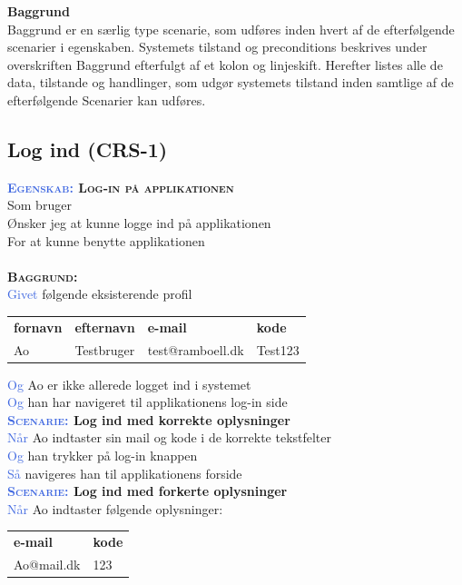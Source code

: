 \large{\textbf{Baggrund}}\\
Baggrund er en særlig type scenarie, som udføres inden hvert af de 
efterfølgende scenarier	i egenskaben. Systemets tilstand og preconditions 
beskrives under overskriften Baggrund efterfulgt af et kolon og 
linjeskift. Herefter listes alle de data, tilstande og handlinger, som udgør 
systemets tilstand inden samtlige af de efterfølgende Scenarier kan	udføres.


\subsection{Log ind (CRS-1)} \label{sec:USLogInd}
\textbf{\textsc{\textcolor{RoyalBlue} {Egenskab:} Log-in på applikationen}} \\
Som bruger\\
Ønsker jeg at kunne logge ind på applikationen\\
For at kunne benytte applikationen\\ \\

\textbf{\textsc{\color{RoyalBlue}Baggrund:}}\\
\textcolor{RoyalBlue}{Givet} følgende eksisterende profil\\
\begin{tabular}{| l | l | l | l |}
	\textbf{fornavn} & \textbf{efternavn} & \textbf{e-mail} & \textbf{kode} \\
	Ao & Testbruger & test@ramboell.dk & Test123\\
\end{tabular}
\newline \newline
\textcolor{RoyalBlue}{Og} Ao er ikke allerede logget ind i systemet\\
\textcolor{RoyalBlue}{Og} han har navigeret til applikationens log-in side\\

\textbf{\textsc{\textcolor{RoyalBlue}{Scenarie:}} Log ind med korrekte oplysninger}\\
\textcolor{RoyalBlue}{Når} Ao indtaster sin mail og kode i de korrekte tekstfelter\\
\textcolor{RoyalBlue}{Og} han trykker på log-in knappen\\
\textcolor{RoyalBlue}{Så} navigeres han til applikationens forside\\

\textbf{\textsc{\textcolor{RoyalBlue}{Scenarie:}} Log ind med forkerte oplysninger} \\
\textcolor{RoyalBlue}{Når} Ao indtaster følgende oplysninger:\\
\begin{tabular}{| l | l |}
	\textbf{e-mail} & \textbf{kode}\\
	Ao@mail.dk & 123\\
\end{tabular}


